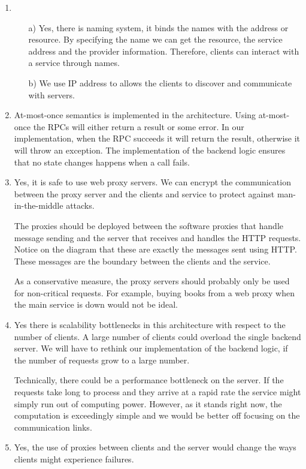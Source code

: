 \documentclass[11pt]{article}
\begin{document}
\begin{enumerate}
\begin{itemize}
    \end{itemize}
  \item
    \begin{itemize}
      \item[a)]
        Yes, there is naming system, it binds the names with the address or
        resource.  By specifying the name  we can get the resource, the service
        address and the provider information. Therefore, clients can interact with a
        service through names.

      \item[b)]
        We use IP address to allows the clients to discover and communicate with
        servers.
    \end{itemize}
  \item
    At-most-once semantics is implemented in the architecture. Using at-most-once
    the RPCs will either return a result or some error. In our
    implementation, when the RPC succeeds it will return the result, otherwise it
    will throw an exception. The implementation of the backend logic ensures
    that no state changes happens when a call fails.
  \item
    Yes, it is safe to use web proxy servers. We can encrypt the
    communication between the proxy server and the clients and service to
    protect against man-in-the-middle attacks. 

    The proxies should be deployed between the software proxies that handle
    message sending and the server that receives and handles the HTTP requests.
    Notice on the diagram that these are exactly the messages sent using HTTP.
    These messages are the boundary between the clients and the service.

    As a conservative measure, the proxy servers should probably only be used
    for non-critical requests. For example, buying books from a web proxy when
    the main service is down would not be ideal.
  \item
    Yes there is scalability bottlenecks in this architecture with respect to the
    number of clients. A large number of clients could overload the single
    backend server. We will have to rethink our implementation of the
    backend logic, if the number of requests grow to a large number.

    Technically, there could be a performance bottleneck on the server. If
    the requests take long to process and they arrive at a rapid rate the
    service might simply run out of computing power. However, as it stands
    right now, the computation is exceedingly simple and we would be better
    off focusing on the communication links.
  \item
    Yes, the use of proxies between clients and the server would change the ways
    clients might experience failures.
    

\end{enumerate}
\end{document}
